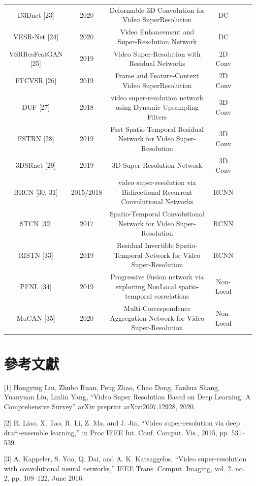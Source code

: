 \documentclass[11pt,UTF8]{ctexart}
\begin{document}
\begin{center}
{\begin{tabular}{cccccc}
D3Dnet [23] & 2020 & Deformable 3D Convolution for Video SuperResolution & DC \\
VESR-Net [24] & 2020 & Video Enhancement and Super-Resolution Network & DC \\
VSRResFeatGAN [25] & 2019 & Video Super-Resolution with Residual Networks & 2D Conv \\
FFCVSR [26] & 2019 & Frame and Feature-Context Video SuperResolution & 2D Conv \\
DUF [27] & 2018 & video super-resolution network using Dynamic Upsampling Filters & 3D Conv \\
FSTRN [28] & 2019 & Fast Spatio-Temporal Residual Network for Video Super-Resolution  & 3D Conv \\
3DSRnet [29] & 2019 & 3D Super-Resolution Network & 3D Conv \\
BRCN [30, 31] & 2015/2018 & video super-resolution via Bidirectional Recurrent Convolutional Networks & RCNN \\
STCN [32] & 2017 & Spatio-Temporal Convolutional Network for Video Super-Resolution & RCNN \\
RISTN [33] & 2019 & Residual Invertible Spatio-Temporal Network for Video Super-Resolution & RCNN \\
PFNL [34] & 2019 & Progressive Fusion network via exploiting NonLocal spatio-temporal correlations & Non-Local \\
MuCAN [35] & 2020 & Multi-Correspondence Aggregation Network for Video Super-Resolution & Non-Local \\
\hline
\end{tabular}}
\end{center}

\newpage

\section{參考文獻}

[1] Hongying Liu, Zhubo Ruan, Peng Zhao, Chao Dong, Fanhua Shang, Yuanyuan Liu, Linlin Yang, “Video Super Resolution Based on Deep Learning: A Comprehensive Survey” arXiv preprint arXiv:2007.12928, 2020.

[2] R. Liao, X. Tao, R. Li, Z. Ma, and J. Jia, “Video super-resolution via deep draft-ensemble learning,” in Proc IEEE Int. Conf. Comput. Vis., 2015, pp. 531–539.

[3] A. Kappeler, S. Yoo, Q. Dai, and A. K. Katsaggelos, “Video super-resolution with convolutional neural networks,” IEEE Trans. Comput. Imaging, vol. 2, no. 2, pp. 109–122, June 2016.
\end{document}
